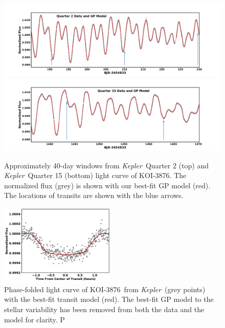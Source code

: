 \documentclass[twocolumn]{aastex631}
\newcommand{\starname}{KOI-3876}
\newcommand{\kepler}{{\it Kepler}}
\begin{document}
\begin{figure}[tb]
    \centering
    \includegraphics[trim=50 0 50 0,clip=True,width=\textwidth]{q2GP.pdf}
    \includegraphics[trim=50 0 50 0,clip=True, width=\textwidth]{q15GP.pdf}
    \caption{Approximately 40-day windows from \kepler\ Quarter 2 (top) and \kepler\ Quarter 15 (bottom) light curve of \starname. The normalized flux (grey) is shown with our best-fit GP model (red). The locations of transits are shown with the blue arrows.}
    \label{fig:quarter2GP}
\end{figure} 



\begin{figure}[tb]
    \centering
    \includegraphics[width=0.49\textwidth]{eccTransit.pdf}
    \caption{Phase-folded light curve of \starname\ from \kepler\ (grey points) with the best-fit transit model (red). The best-fit GP model to the stellar variability has been removed from both the data and the model for clarity. P}
    \label{fig:ecctransit}
\end{figure} 
\end{document}
